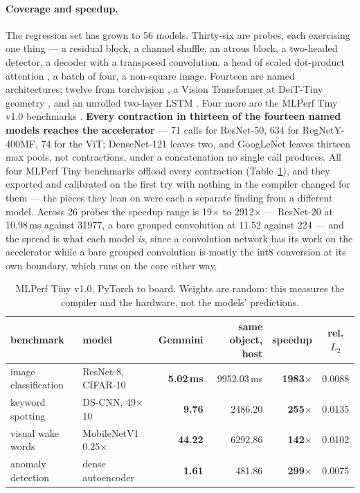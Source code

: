 \documentclass[runningheads]{llncs}
\begin{document}
\paragraph{Coverage and speedup.} The regression set has grown to 56 models.
Thirty-six are probes, each exercising one thing --- a residual block, a channel
shuffle, an atrous block, a two-headed detector, a decoder with a transposed
convolution, a head of scaled dot-product attention \cite{attention}, a batch of
four, a non-square image. Fourteen are named architectures: twelve from
torchvision \cite{torchvision}, a Vision Transformer at DeiT-Tiny geometry
\cite{vit}, and an unrolled two-layer LSTM \cite{lstm}. Four more are the MLPerf
Tiny v1.0 benchmarks \cite{mlperftiny}. \textbf{Every contraction in thirteen of the fourteen named models reaches the
accelerator} --- 71 calls for ResNet-50, 634 for RegNetY-400MF, 74 for the ViT;
DenseNet-121 leaves two, and GoogLeNet leaves thirteen max pools, not
contractions, under a concatenation no single call produces. All four MLPerf Tiny benchmarks offload
every contraction (Table~\ref{tab:mlperf}), and they exported and calibrated on the
first try with nothing in the compiler changed for them --- the pieces they lean on
were each a separate finding from a different model. Across 26 probes the speedup range is 19$\times$ to 2912$\times$ --- ResNet-20 at
10.98\,ms against 31977, a bare grouped convolution at 11.52 against 224 --- and
the spread is what each model \emph{is}, since a
convolution network has its work on the accelerator while a bare grouped
convolution is mostly the int8 conversion at its own boundary, which runs on the
core either way.

\begin{table}[t]
\caption{MLPerf Tiny v1.0, PyTorch to board. Weights are random: this measures the
compiler and the hardware, not the models' predictions.}\label{tab:mlperf}
\centering
\footnotesize
\begin{tabular}{|l|l|r|r|r|c|}
\hline
benchmark & model & Gemmini & same object, host & speedup & rel. $L_2$ \\
\hline
image classification & ResNet-8, CIFAR-10 & \textbf{5.02\,ms} & 9952.03\,ms & \textbf{1983$\times$} & 0.0088 \\
keyword spotting & DS-CNN, 49$\times$10 & \textbf{9.76} & 2486.20 & \textbf{255$\times$} & 0.0135 \\
visual wake words & MobileNetV1 0.25$\times$ & \textbf{44.22} & 6292.86 & \textbf{142$\times$} & 0.0102 \\
anomaly detection & dense autoencoder & \textbf{1.61} & 481.86 & \textbf{299$\times$} & 0.0075 \\
\hline
\end{tabular}
\end{table}
\end{document}

